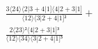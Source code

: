 \documentclass[varwidth, border=5pt]{standalone}
\begin{document}
\begin{my}
$\begin{gathered}
\scriptscriptstyle\frac{3⟨24⟩⟨2|3+4|1]⟨4|2+3|1]}{⟨12⟩⟨3|2+4|1]²} +\\
\scriptscriptstyle\frac{2⟨23⟩²⟨4|2+3|1]³}{⟨12⟩⟨34⟩⟨3|2+4|1]³} \phantom{+}
\end{gathered}$
\end{my}
\end{document}
